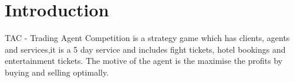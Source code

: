 \section{Introduction}

TAC - Trading Agent Competition is a strategy game which has clients, agents and services,it is a 5 day service and includes fight tickets, hotel bookings and entertainment tickets. The motive of the agent is the maximise the profits by buying and selling optimally. 

